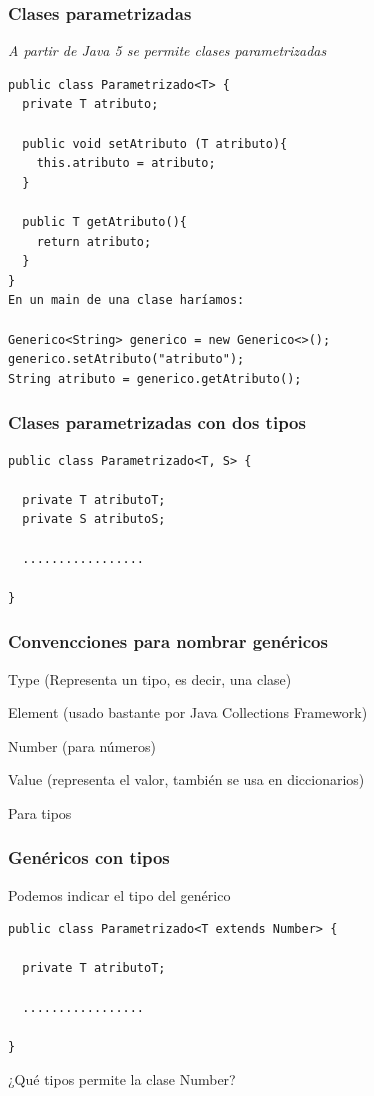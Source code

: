 \documentclass{beamer}
\begin{document}
\begin{frame}[fragile]
\frametitle{Clases parametrizadas}
\emph{A partir de Java 5 se permite clases parametrizadas}
\begin{verbatim}
public class Parametrizado<T> {
  private T atributo;
  
  public void setAtributo (T atributo){
    this.atributo = atributo;  
  }
  
  public T getAtributo(){
    return atributo;
  }
}
En un main de una clase haríamos:

Generico<String> generico = new Generico<>();
generico.setAtributo("atributo");
String atributo = generico.getAtributo();
\end{verbatim}
\end{frame}


\begin{frame}[fragile]
\frametitle{Clases parametrizadas con dos tipos}
\begin{verbatim}
public class Parametrizado<T, S> {

  private T atributoT;
  private S atributoS;
  
  .................

}
\end{verbatim}
\end{frame}


\begin{frame}
\frametitle{Convencciones para nombrar genéricos}
\begin{description}[<+->]
\item[T] Type (Representa un tipo, es decir, una clase)
\item[E] Element (usado bastante por Java Collections Framework)
\item[N] Number (para números)
\item[V] Value (representa el valor, también se usa en diccionarios)
\item[S,U,V ...] Para tipos
\end{description}

\end{frame}

\begin{frame}[fragile]
\frametitle{Genéricos con tipos}
Podemos indicar el tipo del genérico
\begin{verbatim}
public class Parametrizado<T extends Number> {

  private T atributoT;
 
  .................

}
\end{verbatim}
¿Qué tipos permite la clase Number?
\end{frame}
\end{document}
